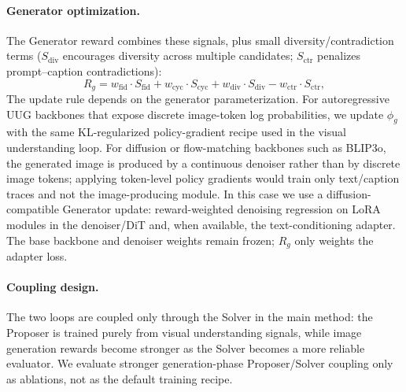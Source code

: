 \paragraph{Generator optimization.}
The Generator reward combines these signals, plus small diversity/contradiction terms ($S_{\text{div}}$ encourages diversity across multiple candidates; $S_{\text{ctr}}$ penalizes prompt--caption contradictions):
\begin{equation}
    R_g = w_{\text{fid}} \cdot S_{\text{fid}} + w_{\text{cyc}} \cdot S_{\text{cyc}} + w_{\text{div}} \cdot S_{\text{div}} - w_{\text{ctr}} \cdot S_{\text{ctr}},
    \label{eq:gen_reward}
\end{equation}
The update rule depends on the generator parameterization. For autoregressive UUG backbones that expose discrete image-token log probabilities, we update $\phi_g$ with the same KL-regularized policy-gradient recipe used in the visual understanding loop. For diffusion or flow-matching backbones such as BLIP3o, the generated image is produced by a continuous denoiser rather than by discrete image tokens; applying token-level policy gradients would train only text/caption traces and not the image-producing module. In this case we use a diffusion-compatible Generator update: reward-weighted denoising regression on LoRA modules in the denoiser/DiT and, when available, the text-conditioning adapter. The base backbone and denoiser weights remain frozen; $R_g$ only weights the adapter loss.

\paragraph{Coupling design.}
The two loops are coupled only through the Solver in the main method: the Proposer is trained purely from visual understanding signals, while image generation rewards become stronger as the Solver becomes a more reliable evaluator. We evaluate stronger generation-phase Proposer/Solver coupling only as ablations, not as the default training recipe.



